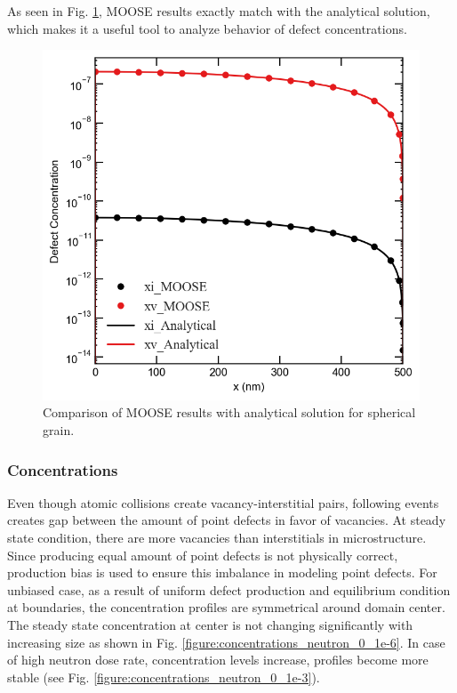 \documentclass[a4paper]{article}
\begin{document}
  As seen in Fig. \ref{figure:concentrations_MOOSE_analytical}, MOOSE results exactly match with the analytical solution, which makes it a useful tool to analyze behavior of defect concentrations.
  \begin{figure}[h!]
    \centering
    \includegraphics[scale=0.55]{concentration_profiles_MOOSE_Analytical_Neutron_0}
    \caption{Comparison of MOOSE results with analytical solution for spherical grain.}
    \label{figure:concentrations_MOOSE_analytical}
  \end{figure}
    \subsubsection{Concentrations} \hspace{10pt}
    Even though atomic collisions create vacancy-interstitial pairs, following events creates gap between the amount of point defects in favor of vacancies. At steady state condition, there are more vacancies than interstitials in microstructure. Since producing equal amount of point defects is not physically correct, production bias is used to ensure this imbalance in modeling point defects. For unbiased case, as a result of uniform defect production and equilibrium condition at boundaries, the concentration profiles are symmetrical around domain center. The steady state concentration at center is not changing significantly with increasing size as shown in Fig. \ref{figure:concentrations_neutron_0_1e-6}. In case of high neutron dose rate, concentration levels increase, profiles become more stable (see Fig. \ref{figure:concentrations_neutron_0_1e-3}).\\
\end{document}
